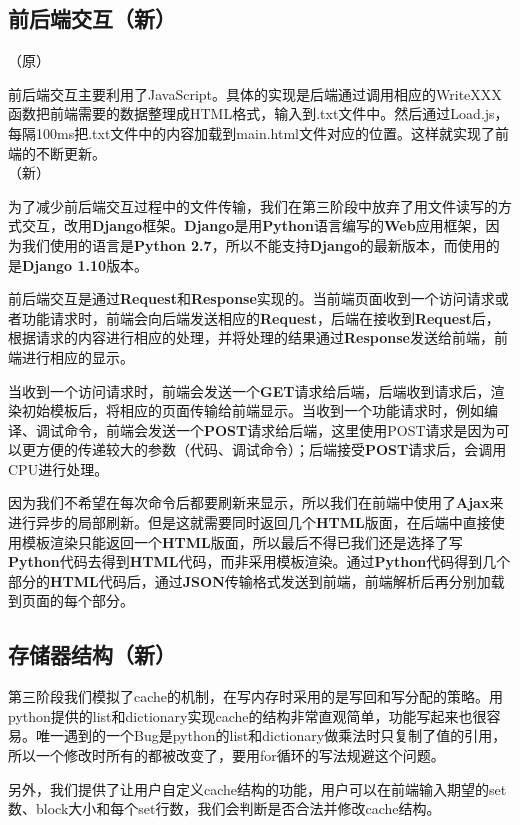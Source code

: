 \documentclass[12pt]{article} %
\begin{document}
\begin{sloppypar}
\subsection{前后端交互（新）}

（原）

前后端交互主要利用了JavaScript。具体的实现是后端通过调用相应的WriteXXX函数把前端需要的数据整理成HTML格式，输入到.txt文件中。然后通过Load.js，每隔100ms把.txt文件中的内容加载到main.html文件对应的位置。这样就实现了前端的不断更新。\\

（新）

为了减少前后端交互过程中的文件传输，我们在第三阶段中放弃了用文件读写的方式交互，改用{\bf Django}框架。{\bf Django}是用{\bf Python}语言编写的{\bf Web}应用框架，因为我们使用的语言是{\bf Python 2.7}，所以不能支持{\bf Django}的最新版本，而使用的是{\bf Django 1.10}版本。

前后端交互是通过{\bf Request}和{\bf Response}实现的。当前端页面收到一个访问请求或者功能请求时，前端会向后端发送相应的{\bf Request}，后端在接收到{\bf Request}后，根据请求的内容进行相应的处理，并将处理的结果通过{\bf Response}发送给前端，前端进行相应的显示。

当收到一个访问请求时，前端会发送一个{\bf GET}请求给后端，后端收到请求后，渲染初始模板后，将相应的页面传输给前端显示。当收到一个功能请求时，例如编译、调试命令，前端会发送一个{\bf POST}请求给后端，这里使用POST请求是因为可以更方便的传递较大的参数（代码、调试命令）；后端接受{\bf POST}请求后，会调用CPU进行处理。

因为我们不希望在每次命令后都要刷新来显示，所以我们在前端中使用了{\bf Ajax}来进行异步的局部刷新。但是这就需要同时返回几个{\bf HTML}版面，在后端中直接使用模板渲染只能返回一个{\bf HTML}版面，所以最后不得已我们还是选择了写{\bf Python}代码去得到{\bf HTML}代码，而非采用模板渲染。通过{\bf Python}代码得到几个部分的{\bf HTML}代码后，通过{\bf JSON}传输格式发送到前端，前端解析后再分别加载到页面的每个部分。

\subsection{存储器结构（新）}

第三阶段我们模拟了cache的机制，在写内存时采用的是写回和写分配的策略。用python提供的list和dictionary实现cache的结构非常直观简单，功能写起来也很容易。唯一遇到的一个Bug是python的list和dictionary做乘法时只复制了值的引用，所以一个修改时所有的都被改变了，要用for循环的写法规避这个问题。

另外，我们提供了让用户自定义cache结构的功能，用户可以在前端输入期望的set数、block大小和每个set行数，我们会判断是否合法并修改cache结构。


\end{sloppypar}
\end{document}
